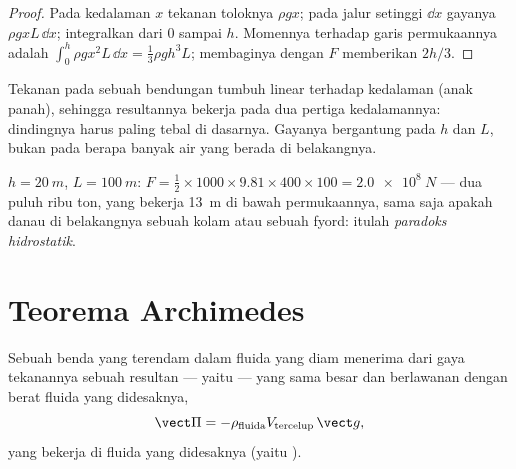 \begin{proof}
Pada kedalaman $x$ tekanan toloknya $\rho gx$; pada jalur setinggi
$\dd x$ gayanya $\rho gxL\,\dd x$; integralkan dari $0$ sampai $h$. Momennya
terhadap garis permukaannya adalah $\int_0^h\rho gx^2L\,\dd x = \tfrac13\rho gh^3L$;
membaginya dengan $F$ memberikan  $2h/3$.
\end{proof}

\begin{omfigure}

{\small Tekanan pada sebuah bendungan tumbuh linear terhadap kedalaman (anak panah), sehingga
resultannya bekerja pada dua pertiga kedalamannya: dindingnya harus paling tebal di
dasarnya. Gayanya bergantung pada $h$ dan $L$, bukan pada berapa banyak air
yang berada di belakangnya.}
\end{omfigure}

\begin{example}\label{ex:b1:fluid-statics:dam}
$h = \qty{20}{m}$, $L = \qty{100}{m}$: $F = \tfrac12 \times 1000 \times 9.81 \times
400 \times 100 = \qty{2.0e8}{N}$ --- dua puluh ribu ton, yang bekerja
\qty{13}{m} di bawah permukaannya, sama saja apakah danau di belakangnya sebuah kolam
atau sebuah fyord: itulah \emph{paradoks hidrostatik}.
\end{example}

\section{Teorema Archimedes}

\begin{theorem}[Archimedes]\label{thm:b1:fluid-statics:archimedes}
Sebuah benda yang terendam dalam fluida yang diam menerima dari gaya tekanannya sebuah
resultan --- yaitu \emph{} --- yang sama besar dan berlawanan dengan berat
fluida yang didesaknya,
\[
\vect\Pi = -\rho_{\text{fluida}}V_{\text{tercelup}}\,\vect g ,
\]
yang bekerja di  fluida yang didesaknya (yaitu \emph{}).
\end{theorem}

